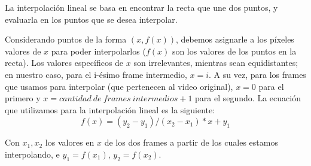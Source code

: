 \par La interpolaci\'on lineal se basa en encontrar la recta que une dos puntos, y evaluarla en los puntos que se desea interpolar.
\par Considerando puntos de la forma $(x, f(x))$, debemos asignarle a los p\'ixeles valores de $x$ para poder interpolarlos ($f(x)$ son los valores de los puntos en la recta).
Los valores espec\'ificos de $x$ son irrelevantes, mientras sean equidistantes; en nuestro caso, para el i-\'esimo frame intermedio, $x = i$. 
A su vez, para los frames que usamos para interpolar (que pertenecen al video original), $x = 0$ para el primero y $x = cantidad\ de\ frames\ intermedios + 1$ para el segundo.
\newline La ecuaci\'on que utilizamos para la interpolaci\'on lineal es la siguiente:
\begin{equation}
f(x) = (y_2 - y_1)/(x_2 - x_1) * x + y_1
\end{equation}
\par Con $x_1, x_2$ los valores en $x$ de los dos frames a partir de los cuales estamos interpolando, e $y_1 = f(x_1)$, $y_2 = f(x_2)$.
